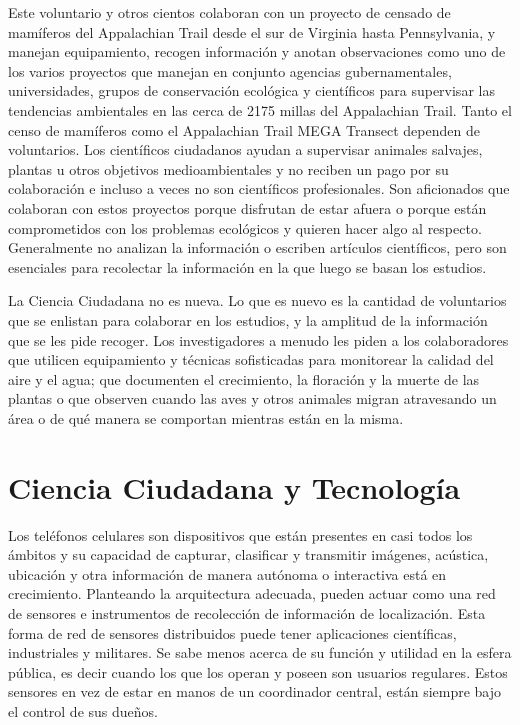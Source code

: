 	Este voluntario y otros cientos colaboran con un proyecto de censado de mamíferos del Appalachian Trail desde el sur de Virginia hasta Pennsylvania, y manejan equipamiento, recogen información y anotan observaciones como uno de los varios proyectos que manejan en conjunto agencias gubernamentales, universidades, grupos de conservación ecológica y científicos para supervisar las tendencias ambientales en las cerca de 2175 millas del Appalachian Trail. Tanto el censo de mamíferos como el Appalachian Trail MEGA Transect dependen de voluntarios. Los científicos ciudadanos ayudan a supervisar animales salvajes, plantas u otros objetivos medioambientales y no reciben un pago por su colaboración e incluso a veces no son científicos profesionales. Son aficionados que colaboran con estos proyectos porque disfrutan de estar afuera o porque están comprometidos con los problemas ecológicos y quieren hacer algo al respecto. Generalmente no analizan la información o escriben artículos científicos, pero son esenciales para recolectar la información en la que luego se basan los estudios. 
	
	La Ciencia Ciudadana no es nueva. Lo que es nuevo es la cantidad de voluntarios que se enlistan para colaborar en los estudios, y la amplitud de la información que se les pide recoger. Los investigadores a menudo les piden a los colaboradores que utilicen equipamiento y técnicas sofisticadas para monitorear la calidad del aire y el agua; que documenten el crecimiento, la floración y la muerte de las plantas o que observen cuando las aves y otros animales migran atravesando un área o de qué manera se comportan mientras están en la misma. 
	


\section{Ciencia Ciudadana y Tecnología}

	Los teléfonos celulares son dispositivos que están presentes en casi todos los ámbitos y su capacidad de capturar, clasificar y transmitir imágenes, acústica, ubicación y otra información de manera autónoma o interactiva está en crecimiento.
Planteando la arquitectura adecuada, pueden actuar como una red de sensores e instrumentos de recolección de información de localización. 
Esta forma de red de sensores distribuidos puede tener aplicaciones científicas, industriales y militares. Se sabe menos acerca de su función y utilidad en la esfera pública, es decir cuando los que los operan y poseen son usuarios regulares.   Estos sensores en vez de estar en manos de un coordinador central, están siempre bajo el control de sus dueños.

